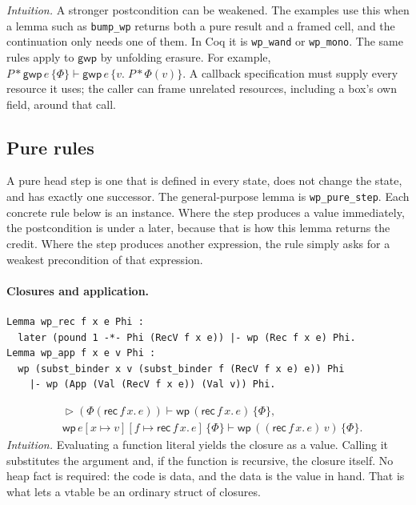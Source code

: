 \documentclass[11pt]{article}
\newcommand{\sep}{\mathbin{*}}
\newcommand{\later}{\mathop{\triangleright}}
\newcommand{\Wpre}{\mathsf{wp}}
\newcommand{\GWpre}{\mathsf{gwp}}
\begin{document}
\noindent\textit{Intuition.}
A stronger postcondition can be weakened.
The examples use this when a lemma such as \texttt{bump\_wp} returns both a pure result and a framed cell, and the continuation only needs one of them.
In Coq it is \texttt{wp\_wand} or \texttt{wp\_mono}.
The same rules apply to \(\GWpre\) by unfolding erasure. For example,
\(P\sep\GWpre\,e\,\{\Phi\}\vdash
\GWpre\,e\,\{v.\;P\sep\Phi(v)\}\).
A callback specification must supply every resource it uses; the caller
can frame unrelated resources, including a box's own field, around that call.

\subsection{Pure rules}

A pure head step is one that is defined in every state, does not change the state, and has exactly one successor.
The general-purpose lemma is \texttt{wp\_pure\_step}.
Each concrete rule below is an instance.
Where the step produces a value immediately, the postcondition is under a later, because that is how this lemma returns the credit.
Where the step produces another expression, the rule simply asks for a weakest precondition of that expression.

\paragraph{Closures and application.}\mbox{}\par
\begin{lstlisting}
Lemma wp_rec f x e Phi :
  later (pound 1 -*- Phi (RecV f x e)) |- wp (Rec f x e) Phi.
Lemma wp_app f x e v Phi :
  wp (subst_binder x v (subst_binder f (RecV f x e) e)) Phi
    |- wp (App (Val (RecV f x e)) (Val v)) Phi.
\end{lstlisting}
\[
\begin{aligned}
&\later(\Phi(\mathsf{rec}\,f\,x.\,e)) \vdash \Wpre\,(\mathsf{rec}\,f\,x.\,e)\,\{\Phi\},\\
&\Wpre\,e[x\mapsto v][f\mapsto \mathsf{rec}\,f\,x.\,e]\,\{\Phi\}
  \vdash
  \Wpre\,((\mathsf{rec}\,f\,x.\,e)\,v)\,\{\Phi\}.
\end{aligned}
\]
\textit{Intuition.}
Evaluating a function literal yields the closure as a value.
Calling it substitutes the argument and, if the function is recursive, the closure itself.
No heap fact is required: the code is data, and the data is the value in hand.
That is what lets a vtable be an ordinary struct of closures.
\end{document}

